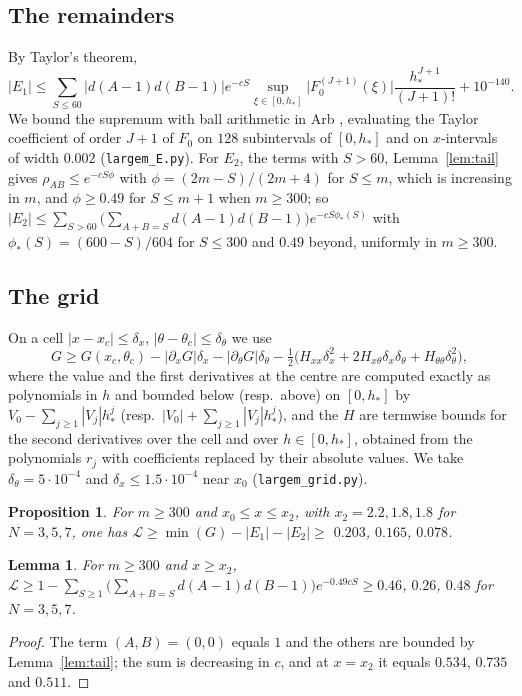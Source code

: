 \documentclass[11pt]{amsart}
\numberwithin{equation}{section}
\theoremstyle{plain}
\newtheorem{lem}[thm]{Lemma}
\newtheorem{prop}[thm]{Proposition}
\theoremstyle{definition}
\theoremstyle{remark}
\newcommand{\cL}{\mathcal{L}}
\newcommand{\LGthree}{$0.203$}\newcommand{\LGfive}{$0.165$}\newcommand{\LGseven}{$0.078$}
\begin{document}
\subsection{The remainders}
By Taylor's theorem,
\[|E_1|\le\sum_{S\le60}|d(A-1)d(B-1)|e^{-cS}\sup_{\xi\in[0,h_*]}\bigl|F_0^{(J+1)}(\xi)\bigr|\frac{h_*^{J+1}}{(J+1)!}+10^{-140}.\] We bound the supremum with ball arithmetic in Arb \cite{Joh17}, evaluating the Taylor coefficient of order $J+1$ of $F_0$ on $128$ subintervals of $[0,h_*]$ and on $x$-intervals of width $0.002$ (\texttt{largem\_E.py}). For $E_2$, the terms with $S>60$, Lemma~\ref{lem:tail} gives $\rho_{AB}\le e^{-cS\phi}$ with $\phi=(2m-S)/(2m+4)$ for $S\le m$, which is increasing in $m$, and $\phi\ge0.49$ for $S\le m+1$ when $m\ge300$; so $|E_2|\le\sum_{S>60}\bigl(\sum_{A+B=S}d(A-1)d(B-1)\bigr)e^{-cS\phi_*(S)}$ with $\phi_*(S)=(600-S)/604$ for $S\le300$ and $0.49$ beyond, uniformly in $m\ge300$.

\subsection{The grid}
On a cell $|x-x_c|\le\delta_x$, $|\theta-\theta_c|\le\delta_\theta$ we use
\[
G\ge G(x_c,\theta_c)-|\partial_xG|\delta_x-|\partial_\theta G|\delta_\theta-\tfrac12\bigl(H_{xx}\delta_x^2+2H_{x\theta}\delta_x\delta_\theta+H_{\theta\theta}\delta_\theta^2\bigr),
\]
where the value and the first derivatives at the centre are computed exactly as polynomials in $h$ and bounded below (resp.\ above) on $[0,h_*]$ by $V_0-\sum_{j\ge1}|V_j|h_*^j$ (resp.\ $|V_0|+\sum_{j\ge1}|V_j|h_*^j$), and the $H$ are termwise bounds for the second derivatives over the cell and over $h\in[0,h_*]$, obtained from the polynomials $r_j$ with coefficients replaced by their absolute values. We take $\delta_\theta=5\cdot10^{-4}$ and $\delta_x\le1.5\cdot10^{-4}$ near $x_0$ (\texttt{largem\_grid.py}).

\begin{prop}\label{prop:large}
For $m\ge300$ and $x_0\le x\le x_2$, with $x_2=2.2,1.8,1.8$ for $N=3,5,7$, one has $\cL\ge\min(G)-|E_1|-|E_2|\ge$ \LGthree, \LGfive, \LGseven.
\end{prop}

\begin{lem}\label{lem:largex}
For $m\ge300$ and $x\ge x_2$, $\cL\ge1-\sum_{S\ge1}\bigl(\sum_{A+B=S}d(A-1)d(B-1)\bigr)e^{-0.49cS}\ge0.46$, $0.26$, $0.48$ for $N=3,5,7$.
\end{lem}

\begin{proof}
The term $(A,B)=(0,0)$ equals $1$ and the others are bounded by Lemma~\ref{lem:tail}; the sum is decreasing in $c$, and at $x=x_2$ it equals $0.534$, $0.735$ and $0.511$.
\end{proof}
\end{document}
